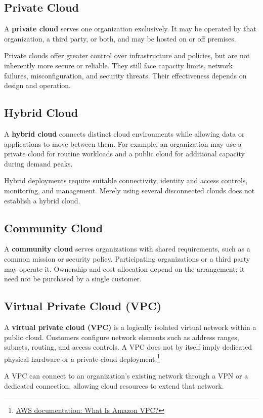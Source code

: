 \subsection{Private Cloud}
A \textbf{private cloud} serves one organization exclusively. It may be operated by that organization, a third party, or both, and may be hosted on or off premises.

Private clouds offer greater control over infrastructure and policies, but are not inherently more secure or reliable. They still face capacity limits, network failures, misconfiguration, and security threats. Their effectiveness depends on design and operation.

\subsection{Hybrid Cloud}
A \textbf{hybrid cloud} connects distinct cloud environments while allowing data or applications to move between them. For example, an organization may use a private cloud for routine workloads and a public cloud for additional capacity during demand peaks.

Hybrid deployments require suitable connectivity, identity and access controls, monitoring, and management. Merely using several disconnected clouds does not establish a hybrid cloud.

\subsection{Community Cloud}
A \textbf{community cloud} serves organizations with shared requirements, such as a common mission or security policy. Participating organizations or a third party may operate it. Ownership and cost allocation depend on the arrangement; it need not be purchased by a single customer.

\subsection{Virtual Private Cloud (VPC)}
A \textbf{virtual private cloud (VPC)} is a logically isolated virtual network within a public cloud. Customers configure network elements such as address ranges, subnets, routing, and access controls. A VPC does not by itself imply dedicated physical hardware or a private-cloud deployment.\footnote{\href{https://docs.aws.amazon.com/vpc/latest/userguide/what-is-amazon-vpc.html}{AWS documentation: What Is Amazon VPC?}}

A VPC can connect to an organization's existing network through a VPN or a dedicated connection, allowing cloud resources to extend that network.

